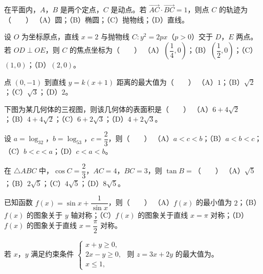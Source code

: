 \begin{question}
在平面内，$A$，$B$ 是两个定点，$C$ 是动点。若 $\overrightarrow{AC}\cdot\overrightarrow{BC}=1$，则点 $C$ 的轨迹为\mbox{（　　）}
（A）圆；（B）椭圆；（C）抛物线；（D）直线。
\end{question}
\begin{question}
设 $O$ 为坐标原点，直线 $x=2$ 与抛物线 $C:y^2=2px$（$p>0$）交于 $D$，$E$ 两点。若 $OD\perp OE$，则 $C$ 的焦点坐标为\mbox{（　　）}
（A）$\left(\dfrac14,0\right)$；（B）$\left(\dfrac12,0\right)$；（C）$(1,0)$；（D）$(2,0)$。
\end{question}
\begin{question}
点 $(0,-1)$ 到直线 $y=k(x+1)$ 距离的最大值为\mbox{（　　）}
（A）$1$；（B）$\sqrt2$；（C）$\sqrt3$；（D）$2$。
\Needspace{0.4\textheight}
\end{question}
\begin{question}
下图为某几何体的三视图，则该几何体的表面积是\mbox{（　　）}
（A）$6+4\sqrt2$；（B）$4+4\sqrt2$；（C）$6+2\sqrt3$；（D）$4+2\sqrt3$。
\nopagebreak[4]
\begin{center}\end{center}
\nopagebreak[4]
\end{question}
\begin{question}
设 $a=\log_32$，$b=\log_53$，$c=\dfrac23$，则\mbox{（　　）}
（A）$a<c<b$；（B）$a<b<c$；（C）$b<c<a$；（D）$c<a<b$。
\end{question}
\begin{question}
在 $\triangle ABC$ 中，$\cos C=\dfrac23$，$AC=4$，$BC=3$，则 $\tan B=$\mbox{（　　）}
（A）$\sqrt5$；（B）$2\sqrt5$；（C）$4\sqrt5$；（D）$8\sqrt5$。
\end{question}
\begin{question}
已知函数 $f(x)=\sin x+\dfrac1{\sin x}$，则\mbox{（　　）}
（A）$f(x)$ 的最小值为 $2$；（B）$f(x)$ 的图象关于 $y$ 轴对称；（C）$f(x)$ 的图象关于直线 $x=\pi$ 对称；（D）$f(x)$ 的图象关于直线 $x=\dfrac\pi2$ 对称。
\end{question}
\begin{question}
若 $x$，$y$ 满足约束条件 $\begin{cases}x+y\geqslant0,\\2x-y\geqslant0,\\x\leqslant1,\end{cases}$ 则 $z=3x+2y$ 的最大值为\gkblank{}。
\end{question}
